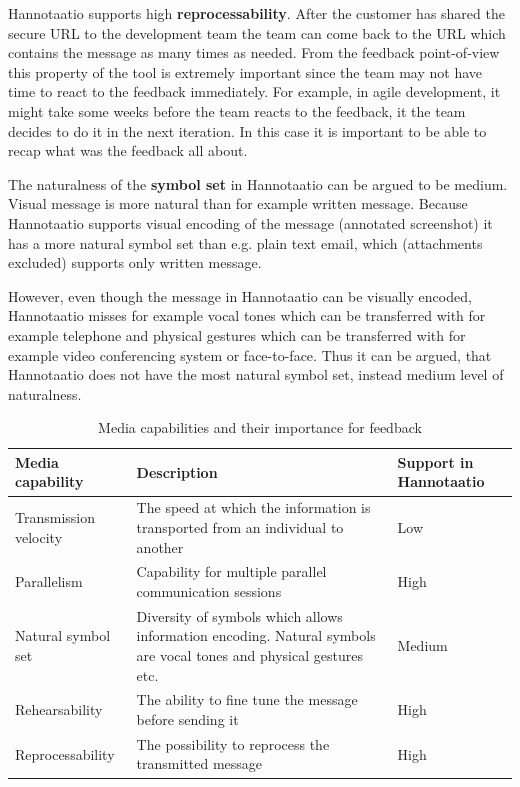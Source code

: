 \documentclass[english,12pt,a4paper,pdftex]{article}
\begin{document}
Hannotaatio supports high \textbf{reprocessability}. After the customer has shared the secure URL to the development team the team can come back to the URL which contains the message as many times as needed. From the feedback point-of-view this property of the tool is extremely important since the team may not have time to react to the feedback immediately. For example, in agile development, it might take some weeks before the team reacts to the feedback, it the team decides to do it in the next iteration. In this case it is important to be able to recap what was the feedback all about.

The naturalness of the \textbf{symbol set} in Hannotaatio can be argued to be medium. Visual message is more natural than for example written message. Because Hannotaatio supports visual encoding of the message (annotated screenshot) it has a more natural symbol set than e.g. plain text email, which (attachments excluded) supports only written message.

However, even though the message in Hannotaatio can be visually encoded, Hannotaatio misses for example vocal tones which can be transferred with for example telephone and physical gestures which can be transferred with for example video conferencing system or face-to-face. Thus it can be argued, that Hannotaatio does not have the most natural symbol set, instead medium level of naturalness.

\begin{table}[!h]
\renewcommand{\arraystretch}{1.3}
\caption{Media capabilities and their importance for feedback}
\label{table:capabilities}
\centering
\begin{tabular}{|p{4cm}|p{7cm}|p{3cm}|}
\hline
\textbf{Media \newline capability} & \textbf{Description} & \textbf{Support in Hannotaatio}\\
\hline
Transmission \newline velocity & The speed at which the information is transported from an individual to another & Low\\
\hline
Parallelism & Capability for multiple parallel communication sessions & High\\
\hline
Natural symbol set & Diversity of symbols which allows information encoding. Natural symbols are vocal tones and physical gestures etc. & Medium\\
\hline
Rehearsability & The ability to fine tune the message before sending it & High\\
\hline
Reprocessability & The possibility to reprocess the transmitted message & High\\
\hline
\end{tabular}
\end{table}
\end{document}
